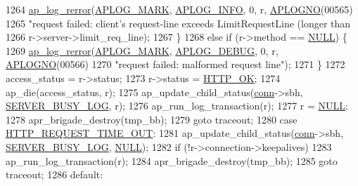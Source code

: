 \begin{DoxyCode}
1264                 \hyperlink{group__APACHE__CORE__LOG_ga4c112558ccffd6b363da102b2052d2a6}{ap\_log\_rerror}(\hyperlink{group__APACHE__CORE__LOG_ga655e126996849bcb82e4e5a14c616f4a}{APLOG\_MARK}, \hyperlink{group__APACHE__CORE__LOG_ga47fafbef7e478babdd92e90407f95b19}{APLOG\_INFO}, 0, r, 
      \hyperlink{group__APACHE__CORE__LOG_ga1dee8a07e06bc5b3de8b89662c2cd666}{APLOGNO}(00565)
1265                               \textcolor{stringliteral}{"request failed: client's request-line exceeds LimitRequestLine (longer than
1266                               r->server->limit\_req\_line);
1267             \}
1268             \textcolor{keywordflow}{else} \textcolor{keywordflow}{if} (r->method == \hyperlink{pcre_8txt_ad7f989d16aa8ca809a36bc392c07fba1}{NULL}) \{
1269                 \hyperlink{group__APACHE__CORE__LOG_ga4c112558ccffd6b363da102b2052d2a6}{ap\_log\_rerror}(\hyperlink{group__APACHE__CORE__LOG_ga655e126996849bcb82e4e5a14c616f4a}{APLOG\_MARK}, \hyperlink{group__APACHE__CORE__LOG_gadfcef90537539cf2b7d35cfbbbafeb93}{APLOG\_DEBUG}, 0, r, 
      \hyperlink{group__APACHE__CORE__LOG_ga1dee8a07e06bc5b3de8b89662c2cd666}{APLOGNO}(00566)
1270                               \textcolor{stringliteral}{"request failed: malformed request line"});
1271             \}
1272             access\_status = r->status;
1273             r->status = \hyperlink{group__HTTP__Status_ga02e6d59009dee759528ec81fc9a8eeff}{HTTP\_OK};
1274             ap\_die(access\_status, r);
1275             ap\_update\_child\_status(\hyperlink{group__MOD__PROXY_gaaf2a99e7e3709d3e41bf0a33f1004b4e}{conn}->sbh, \hyperlink{scoreboard_8h_a27a5c403b65794dc90e380a76a500924}{SERVER\_BUSY\_LOG}, r);
1276             ap\_run\_log\_transaction(r);
1277             r = \hyperlink{pcre_8txt_ad7f989d16aa8ca809a36bc392c07fba1}{NULL};
1278             apr\_brigade\_destroy(tmp\_bb);
1279             \textcolor{keywordflow}{goto} traceout;
1280         \textcolor{keywordflow}{case} \hyperlink{group__HTTP__Status_ga19f05d6acd556bd28c1ffdbb763cf9aa}{HTTP\_REQUEST\_TIME\_OUT}:
1281             ap\_update\_child\_status(\hyperlink{group__MOD__PROXY_gaaf2a99e7e3709d3e41bf0a33f1004b4e}{conn}->sbh, \hyperlink{scoreboard_8h_a27a5c403b65794dc90e380a76a500924}{SERVER\_BUSY\_LOG}, 
      \hyperlink{pcre_8txt_ad7f989d16aa8ca809a36bc392c07fba1}{NULL});
1282             \textcolor{keywordflow}{if} (!r->connection->keepalives)
1283                 ap\_run\_log\_transaction(r);
1284             apr\_brigade\_destroy(tmp\_bb);
1285             \textcolor{keywordflow}{goto} traceout;
1286         \textcolor{keywordflow}{default}:
}
\end{DoxyCode}
